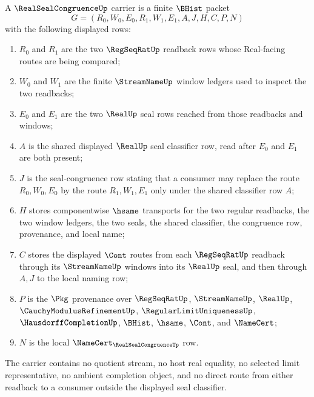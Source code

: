 \begin{definition}
\label{def:real-seal-congruence-carrier}
A $\RealSealCongruenceUp$ carrier is a finite $\BHist$ packet
$$
G=(R_0,W_0,E_0,R_1,W_1,E_1,A,J,H,C,P,N)
$$
with the following displayed rows:
\begin{enumerate}
\item $R_0$ and $R_1$ are the two $\RegSeqRatUp$ readback rows whose Real-facing routes are being compared;
\item $W_0$ and $W_1$ are the finite $\StreamNameUp$ window ledgers used to inspect the two readbacks;
\item $E_0$ and $E_1$ are the two $\RealUp$ seal rows reached from those readbacks and windows;
\item $A$ is the shared displayed $\RealUp$ seal classifier row, read after $E_0$ and $E_1$ are both present;
\item $J$ is the seal-congruence row stating that a consumer may replace the route $R_0,W_0,E_0$ by the route $R_1,W_1,E_1$ only under the shared classifier row $A$;
\item $H$ stores componentwise $\hsame$ transports for the two regular readbacks, the two window ledgers, the two seals, the shared classifier, the congruence row, provenance, and local name;
\item $C$ stores the displayed $\Cont$ routes from each $\RegSeqRatUp$ readback through its $\StreamNameUp$ windows into its $\RealUp$ seal, and then through $A,J$ to the local naming row;
\item $P$ is the $\Pkg$ provenance over $\RegSeqRatUp$, $\StreamNameUp$, $\RealUp$, $\CauchyModulusRefinementUp$, $\RegularLimitUniquenessUp$, $\HausdorffCompletionUp$, $\BHist$, $\hsame$, $\Cont$, and $\NameCert$;
\item $N$ is the local $\NameCert_{\RealSealCongruenceUp}$ row.
\end{enumerate}
The carrier contains no quotient stream, no host real equality, no selected limit representative, no ambient completion object, and no direct route from either readback to a consumer outside the displayed seal classifier.
\end{definition}

